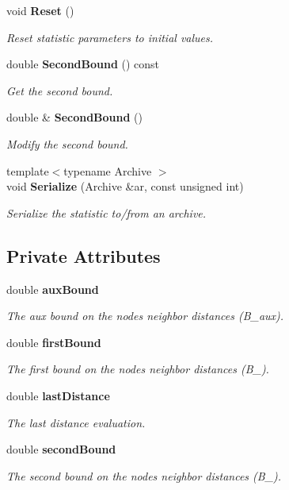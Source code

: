 \begin{DoxyCompactItemize}
void {\bf Reset} ()
\begin{DoxyCompactList}\small\item\em Reset statistic parameters to initial values. \end{DoxyCompactList}\item 
double {\bf Second\+Bound} () const 
\begin{DoxyCompactList}\small\item\em Get the second bound. \end{DoxyCompactList}\item 
double \& {\bf Second\+Bound} ()
\begin{DoxyCompactList}\small\item\em Modify the second bound. \end{DoxyCompactList}\item 
{\footnotesize template$<$typename Archive $>$ }\\void {\bf Serialize} (Archive \&ar, const unsigned int)
\begin{DoxyCompactList}\small\item\em Serialize the statistic to/from an archive. \end{DoxyCompactList}\end{DoxyCompactItemize}
\subsection*{Private Attributes}
\begin{DoxyCompactItemize}
\item 
double {\bf aux\+Bound}
\begin{DoxyCompactList}\small\item\em The aux bound on the node\textquotesingle{}s neighbor distances (B\+\_\+aux). \end{DoxyCompactList}\item 
double {\bf first\+Bound}
\begin{DoxyCompactList}\small\item\em The first bound on the node\textquotesingle{}s neighbor distances (B\+\_). \end{DoxyCompactList}\item 
double {\bf last\+Distance}
\begin{DoxyCompactList}\small\item\em The last distance evaluation. \end{DoxyCompactList}\item 
double {\bf second\+Bound}
\begin{DoxyCompactList}\small\item\em The second bound on the node\textquotesingle{}s neighbor distances (B\+\_). \end{DoxyCompactList}\end{DoxyCompactItemize}


